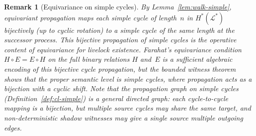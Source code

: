 \documentclass{article}
\newtheorem{remark}{Remark}
\newcommand{\Ls}{\mathcal{L}^{*}}
\newcommand{\Hstar}{H^{*}}
\begin{document}
\begin{remark}[Equivariance on simple cycles]
\label{rem:equiv-simple}
By Lemma~\ref{lem:walk-simple}, equivariant propagation maps
each simple cycle of length~$n$ in $\Hstar(\Ls)$ bijectively
(up to cyclic rotation) to a simple cycle of the same length
at the successor process.
This bijective propagation of simple cycles is the operative content
of equivariance for livelock existence.
Farahat's equivariance condition $H\circ E = E\circ H$ on the full
binary relations $H$ and~$E$ is a sufficient algebraic encoding of
this bijective cycle propagation, but the bounded witness theorem
shows that the proper semantic level is simple cycles, where
propagation acts as a bijection with a cyclic shift.
Note that the propagation graph on simple cycles
(Definition~\ref{def:cl-simple}) is a general directed graph:
each cycle-to-cycle mapping is a bijection, but multiple source
cycles may share the same target, and non-deterministic shadow
witnesses may give a single source multiple outgoing edges.
\end{remark}
\end{document}
